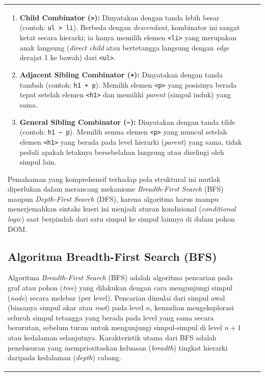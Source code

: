\documentclass[12pt]{article}
\begin{document}
\begin{table}[H]
\begin{tabular}{|l|c|c|}
\begin{document}
\begin{enumerate}
    \item \textbf{Child Combinator (\verb|>|):} Dinyatakan dengan tanda lebih besar (contoh: \verb|ul > li|). Berbeda dengan \textit{descendant}, kombinator ini sangat ketat secara hierarki; ia hanya memilih elemen \verb|<li>| yang merupakan anak langsung (\textit{direct child} atau bertetangga langsung dengan \textit{edge} derajat 1 ke bawah) dari \verb|<ul>|.
    
    \item \textbf{Adjacent Sibling Combinator (\verb|+|):} Dinyatakan dengan tanda tambah (contoh: \verb|h1 + p|). Memilih elemen \verb|<p>| yang posisinya berada tepat setelah elemen \verb|<h1>| dan memiliki \textit{parent} (simpul induk) yang sama.
    
    \item \textbf{General Sibling Combinator (\verb|~|):} Dinyatakan dengan tanda tilde (contoh: \verb|h1 ~ p|). Memilih semua elemen \verb|<p>| yang muncul setelah elemen \verb|<h1>| yang berada pada level hierarki (\textit{parent}) yang sama, tidak peduli apakah letaknya bersebelahan langsung atau diselingi oleh simpul lain.
\end{enumerate}

Pemahaman yang komprehensif terhadap pola struktural ini mutlak diperlukan dalam merancang mekanisme \textit{Breadth-First Search} (BFS) maupun \textit{Depth-First Search} (DFS), karena algoritma harus mampu menerjemahkan sintaks kueri ini menjadi aturan kondisional (\textit{conditional logic}) saat berpindah dari satu simpul ke simpul lainnya di dalam pohon DOM.

\subsection{Algoritma Breadth-First Search (BFS)}

Algoritma \textit{Breadth-First Search} (BFS) adalah algoritma pencarian pada graf atau pohon (\textit{tree}) yang dilakukan dengan cara mengunjungi simpul (\textit{node}) secara melebar (per level). Pencarian dimulai dari simpul awal (biasanya simpul akar atau \textit{root}) pada level $n$, kemudian mengeksplorasi seluruh simpul tetangga yang berada pada level yang sama secara berurutan, sebelum turun untuk mengunjungi simpul-simpul di level $n+1$ atau kedalaman selanjutnya. Karakteristik utama dari BFS adalah penelusuran yang memprioritaskan keluasan (\textit{breadth}) tingkat hierarki daripada kedalaman (\textit{depth}) cabang.


\end{document}
\end{tabular}
\end{table}
\end{document}
